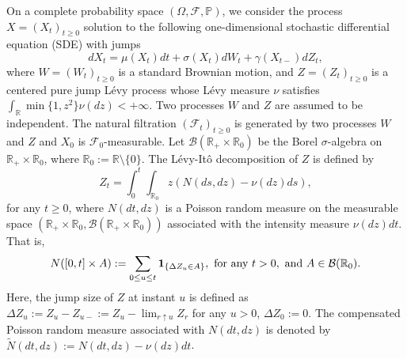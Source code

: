 \documentclass[11pt]{article}
\theoremstyle{theorem}
\theoremstyle{definition}
\newcommand{\mf}{\mathcal{F}}
\newcommand{\pr}{\mathbb{P}}
\newcommand{\Om}{\Omega}
\newcommand{\1}{{\bf 1}}
\begin{document}
On a complete probability space $(\Om, \mf, \pr)$, we consider the process $X=(X_t)_{t\geq 0}$ solution to the following one-dimensional stochastic differential equation (SDE) with jumps
\begin{equation} \label{eqn1}
dX_t=\mu(X_t)dt+\sigma(X_t)dW_t + \gamma \left(X_{t-}\right) dZ_t, 
\end{equation}
where $W=(W_t)_{t\geq 0}$ is a standard Brownian motion, and $Z=(Z_t)_{t\geq 0}$ is a centered pure jump L\'evy process whose L\'evy measure $\nu$ satisfies $\int_{\mathbb{R}}\min\{1, z^2\} \nu(dz)<+\infty$. Two processes $W$ and $Z$ are assumed to be independent.  The natural filtration $(\mf_t)_{t\geq 0}$ is generated by two processes $W$ and $Z$ and $X_0$ is $\mathcal{F}_0$-measurable. Let $\mathcal{B}(\mathbb{R}_{+}\times \mathbb{R}_0)$ be the Borel $\sigma$-algebra on $\mathbb{R}_{+}\times \mathbb{R}_0$, where $\mathbb{R}_0:=\mathbb{R}\setminus\{0\}$.  The L\'evy-It\^o decomposition of $Z$ is defined by
$$
Z_t=\int_{0}^{t}\int_{\mathbb{R}_0}z(N(ds,dz)-\nu(dz)ds), 
$$
for any $t\geq 0$, where $N(dt,dz)$ is a Poisson random measure on the measurable space $(\mathbb{R}_{+}\times \mathbb{R}_0,\mathcal{B}(\mathbb{R}_{+}\times \mathbb{R}_0))$  associated  with the intensity measure $\nu(dz)dt$. That is, 
$$
N([0,t] \times A):=\sum_{0\leq u\leq t}{\bf 1}_{\{\Delta Z_u \in A \}},
\text{ for any } t > 0, \text{ and  } A \in \mathcal{B}(\mathbb{R}_0).$$
Here, the jump size of $Z$ at instant $u$ is defined as $\Delta Z_u:=Z_u-Z_{u-}:=Z_u-\lim_{r \uparrow u}Z_{r}$ for any $u>0$, $\Delta Z_0:=0$.
The compensated Poisson random measure associated with $N(dt,dz)$ is denoted by $\widetilde{N}(dt,dz):=N(dt,dz)-\nu(dz)dt$.
\end{document}
